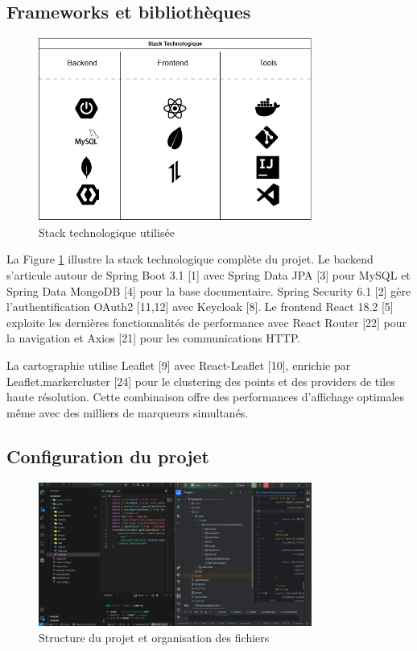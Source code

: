 \subsection{Frameworks et bibliothèques}

\begin{figure}[H]
\centering
\includegraphics[width=0.8\textwidth]{images/tech_stack.png}
\caption{Stack technologique utilisée}
\label{fig:tech_stack}
\end{figure}

La Figure \ref{fig:tech_stack} illustre la stack technologique complète du projet. Le backend s'articule autour de Spring Boot 3.1 [1] avec Spring Data JPA [3] pour MySQL et Spring Data MongoDB [4] pour la base documentaire. Spring Security 6.1 [2] gère l'authentification OAuth2 [11,12] avec Keycloak [8]. Le frontend React 18.2 [5] exploite les dernières fonctionnalités de performance avec React Router [22] pour la navigation et Axios [21] pour les communications HTTP.

La cartographie utilise Leaflet [9] avec React-Leaflet [10], enrichie par Leaflet.markercluster [24] pour le clustering des points et des providers de tiles haute résolution. Cette combinaison offre des performances d'affichage optimales même avec des milliers de marqueurs simultanés.

\subsection{Configuration du projet}

\begin{figure}[H]
\centering
\includegraphics[width=0.8\textwidth]{images/project_structure.png}
\caption{Structure du projet et organisation des fichiers}
\label{fig:project_structure}
\end{figure}

